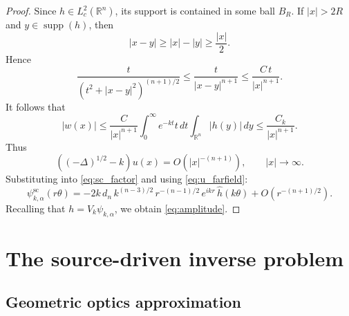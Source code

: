 \documentclass[12pt,a4paper]{amsart}
\numberwithin{equation}{section}
\theoremstyle{plain}
\theoremstyle{definition}
\begin{document}
\begin{proof}
Since $h\in L_c^2(\mathbb{R}^n)$, its support is contained in some ball $B_R$.
If $|x|>2R$ and $y\in\operatorname{supp}(h)$, then
\begin{equation*}
    |x-y|\ge |x|-|y|\ge \frac{|x|}{2}.
\end{equation*}
Hence
\begin{equation*}
    \frac{t}{(t^2+|x-y|^2)^{(n+1)/2}}
    \le
    \frac{t}{|x-y|^{n+1}}
    \le
    \frac{C\,t}{|x|^{n+1}}.
\end{equation*}
It follows that
\begin{equation*}
    |w(x)|
    \le
    \frac{C}{|x|^{n+1}}
    \int_0^\infty e^{-kt}t\,dt
    \int_{\mathbb{R}^n}|h(y)|\,dy
    \le
    \frac{C_k}{|x|^{n+1}}.
\end{equation*}
Thus
\begin{equation*}
    ((-\Delta)^{1/2}-k)u(x)=O(|x|^{-(n+1)}),
    \qquad |x|\to\infty.
\end{equation*}
Substituting into \eqref{eq:sc_factor} and using \eqref{eq:u_farfield}:
\begin{equation*}
\psi^{\mathrm{sc}}_{k,\alpha} (r\theta)
= - 2k\, d_n\, k^{(n-3)/2}\, r^{-(n-1)/2}\, e^{ikr}\, \hat{h}(k\theta)
+ O(r^{-(n+1)/2}).
\end{equation*}
Recalling that $h=V_k\psi_{k,\alpha}$, we obtain \eqref{eq:amplitude}.
\end{proof}




\section{The source-driven inverse problem}\label{sec:source}


\subsection{Geometric optics approximation}
\end{document}

